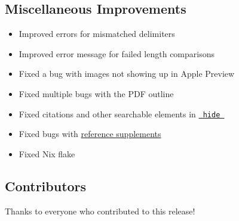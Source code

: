 \subsection{Miscellaneous
Improvements}\label{miscellaneous-improvements}

\begin{itemize}
\tightlist
\item
  Improved errors for mismatched delimiters
\item
  Improved error message for failed length comparisons
\item
  Fixed a bug with images not showing up in Apple Preview
\item
  Fixed multiple bugs with the PDF outline
\item
  Fixed citations and other searchable elements in
  \href{/docs/reference/layout/hide/}{\texttt{\ hide\ }}
\item
  Fixed bugs with
  \href{/docs/reference/model/ref/\#parameters-supplement}{reference
  supplements}
\item
  Fixed Nix flake
\end{itemize}

\subsection{Contributors}\label{contributors}

Thanks to everyone who contributed to this release!

